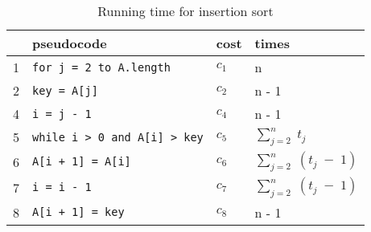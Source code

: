 \begin{center}
	\begin{table}[H]
		\centering
		\begin{tabular}{|l|l|l|l|}
			 \hline
			  & \textbf{pseudocode} & \textbf{cost}	& \textbf{times}					\\ \hline
			1 & \lstinline|for j = 2 to A.length| 					& $c_1$ 		& n 								\\
			2 & \quad\quad \lstinline|key = A[j]| 					& $c_2$ 		& n - 1 							\\
			4 & \quad\quad \lstinline|i = j - 1| 					& $c_4$ 		& n - 1 							\\
			5 & \quad\quad \lstinline|while i > 0 and A[i] > key|	& $c_5$ 		&  $\sum_{j=2}^{n}\;t_j$ 			\\
			6 & \quad\quad\quad\quad \lstinline|A[i + 1] = A[i]|	& $c_6$ 		&  $\sum_{j=2}^{n}\;(t_j\;-\;1)$ 	\\
			7 & \quad\quad\quad\quad \lstinline|i = i - 1| 			& $c_7$ 		&  $\sum_{j=2}^{n}\;(t_j\;-\;1)$ 	\\
			8 & \quad\quad \lstinline|A[i + 1] = key| 			& $c_8$ 		&  n - 1 	\\ \hline
		\end{tabular}
		\caption{Running time for insertion sort}
		\label{tab:insertionCode}
	\end{table}
\end{center}